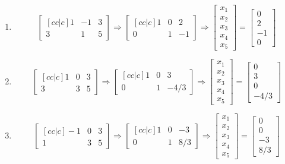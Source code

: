 \documentclass[12pt]{extarticle}
\theoremstyle{definition}
\begin{document}
\begin{problem}
\begin{enumerate}
	\item $$\begin{bmatrix}[cc|c] 1&-1&3\\3&1&5 \end{bmatrix} \Longrightarrow
		\begin{bmatrix}[cc|c] 1&0&2\\0&1&-1 \end{bmatrix} \Longrightarrow
		\begin{bmatrix} x_1\\x_2\\x_3\\x_4\\x_5 \end{bmatrix} = \begin{bmatrix} 0\\2\\-1\\0\end{bmatrix}$$
	\item $$\begin{bmatrix}[cc|c] 1&0&3\\3&3&5 \end{bmatrix} \Longrightarrow
		\begin{bmatrix}[cc|c] 1&0&3\\0&1&-4/3 \end{bmatrix} \Longrightarrow
		\begin{bmatrix} x_1\\x_2\\x_3\\x_4\\x_5 \end{bmatrix} = \begin{bmatrix} 0\\3\\0\\-4/3\end{bmatrix}$$
	\item $$\begin{bmatrix}[cc|c] -1&0&3\\1&3&5 \end{bmatrix} \Longrightarrow
		\begin{bmatrix}[cc|c] 1&0&-3\\0&1&8/3 \end{bmatrix} \Longrightarrow
		\begin{bmatrix} x_1\\x_2\\x_3\\x_4\\x_5 \end{bmatrix} = \begin{bmatrix} 0\\0\\-3\\8/3\end{bmatrix}$$
	\end{enumerate}

\end{problem}
\end{document}
